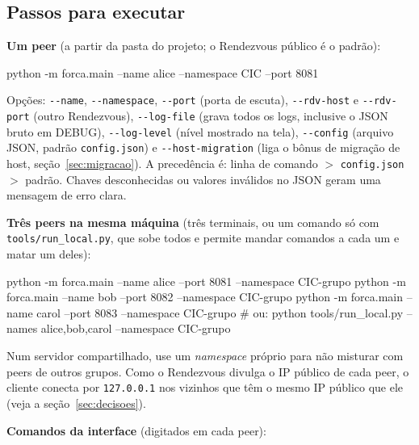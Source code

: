 \documentclass[11pt,a4paper]{article}
\begin{document}
\subsection{Passos para executar}
\textbf{Um peer} (a partir da pasta do projeto; o Rendezvous público é o padrão):
\begin{codigo}
python -m forca.main --name alice --namespace CIC --port 8081
\end{codigo}
Opções: \texttt{-{}-name}, \texttt{-{}-namespace}, \texttt{-{}-port} (porta de escuta), \texttt{-{}-rdv-host} e \texttt{-{}-rdv-port} (outro Rendezvous), \texttt{-{}-log-file} (grava todos os logs, inclusive o JSON bruto em DEBUG), \texttt{-{}-log-level} (nível mostrado na tela), \texttt{-{}-config} (arquivo JSON, padrão \texttt{config.json}) e \texttt{-{}-host-migration} (liga o bônus de migração de host, seção~\ref{sec:migracao}). A precedência é: linha de comando $>$ \texttt{config.json} $>$ padrão. Chaves desconhecidas ou valores inválidos no JSON geram uma mensagem de erro clara.

\textbf{Três peers na mesma máquina} (três terminais, ou um comando só com \texttt{tools/run\_local.py}, que sobe todos e permite mandar comandos a cada um e matar um deles):
\begin{codigo}
python -m forca.main --name alice --port 8081 --namespace CIC-grupo
python -m forca.main --name bob   --port 8082 --namespace CIC-grupo
python -m forca.main --name carol --port 8083 --namespace CIC-grupo
# ou:
python tools/run_local.py --names alice,bob,carol --namespace CIC-grupo
\end{codigo}
{\small Num servidor compartilhado, use um \emph{namespace} próprio para não misturar com peers de outros grupos. Como o Rendezvous divulga o IP público de cada peer, o cliente conecta por \texttt{127.0.0.1} nos vizinhos que têm o mesmo IP público que ele (veja a seção~\ref{sec:decisoes}).}

\textbf{Comandos da interface} (digitados em cada peer):
\end{document}
